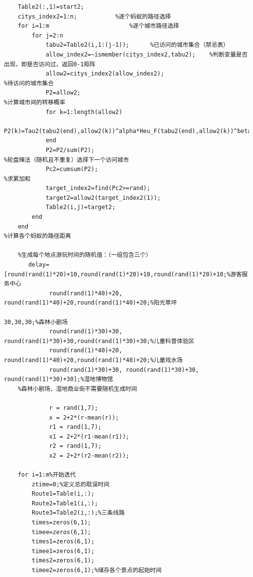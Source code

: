\documentclass[hyperref,UTF8]{article}
\begin{document}
\begin{lstlisting}
    Table2(:,1)=start2;
    citys_index2=1:n;           %逐个蚂蚁的路径选择
    for i=1:m                       %逐个城市路径选择
        for j=2:n
            tabu2=Table2(i,1:(j-1));      %已访问的城市集合（禁忌表）
            allow_index2=~ismember(citys_index2,tabu2);    %判断变量是否出现，即是否访问过，返回0-1矩阵
            allow2=citys_index2(allow_index2);                        %待访问的城市集合
            P2=allow2;                                                            %计算城市间的转移概率
            for k=1:length(allow2)
                P2(k)=Tau2(tabu2(end),allow2(k))^alpha*Heu_F(tabu2(end),allow2(k))^beta;
            end
            P2=P2/sum(P2);                                                        %轮盘赌法（随机且不重复）选择下一个访问城市
            Pc2=cumsum(P2);                                                   %求累加和
            target_index2=find(Pc2>=rand);                    
            target2=allow2(target_index2(1));
            Table2(i,j)=target2;
        end
    end                                                                         %计算各个蚂蚁的路径距离
    
    %生成每个地点游玩时间的随机值：（一组包含三个）
       delay=[round(rand(1)*20)+10,round(rand(1)*20)+10,round(rand(1)*20)+10;%游客服务中心
             round(rand(1)*40)+20, round(rand(1)*40)+20,round(rand(1)*40)+20;%阳光草坪
                                                                    30,30,30;%森林小剧场
             round(rand(1)*30)+30, round(rand(1)*30)+30,round(rand(1)*30)+30;%儿童科普体验区
             round(rand(1)*40)+20, round(rand(1)*40)+20,round(rand(1)*40)+20;%儿童戏水场
             round(rand(1)*30)+30, round(rand(1)*30)+30, round(rand(1)*30)+30];%湿地博物馆
    %森林小剧场、湿地商业街不需要随机生成时间
    
             r = rand(1,7);
             x = 2+2*(r-mean(r));
             r1 = rand(1,7);
             x1 = 2+2*(r1-mean(r1));
             r2 = rand(1,7);
             x2 = 2+2*(r2-mean(r2));
    
    for i=1:m%开始迭代
        ztime=0;%定义总的耽误时间
        Route1=Table(i,:);
        Route2=Table1(i,:);
        Route3=Table2(i,:);%三条线路
        times=zeros(6,1);
        timee=zeros(6,1);
        times1=zeros(6,1);
        timee1=zeros(6,1);
        times2=zeros(6,1);
        timee2=zeros(6,1);%储存各个景点的起始时间
        

\end{lstlisting}
\end{document}
